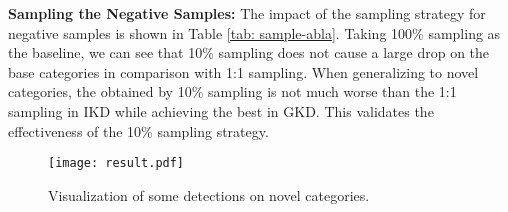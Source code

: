 \documentclass[10pt,twocolumn,letterpaper]{article}
\begin{document}
\noindent \textbf{Sampling the Negative Samples:} The impact of the sampling strategy for negative samples is shown in Table \ref{tab: sample-abla}. Taking 100\% sampling as the baseline, we can see that 10\% sampling does not cause a large  drop on the base categories in comparison with 1:1 sampling. 
When generalizing to novel categories, the  obtained by 10\% sampling is not much worse than the 1:1 sampling in IKD while achieving the best in GKD. This validates the effectiveness of the 10\% sampling strategy.


\begin{figure}[t]
\centering
\texttt{[image: result.pdf]}
\caption{Visualization of some detections on novel categories.}
\label{fig:vis}
\end{figure}

\begin{table}[]
\centering
\footnotesize
{}
\caption{Comparison with the direct inference with CLIP. Model and CLIP represent inference with the detector from distillation and direct inference with CLIP respectively.}
\label{tab: per-gap}
\vspace{-1.4em}
\end{table}
\end{document}

